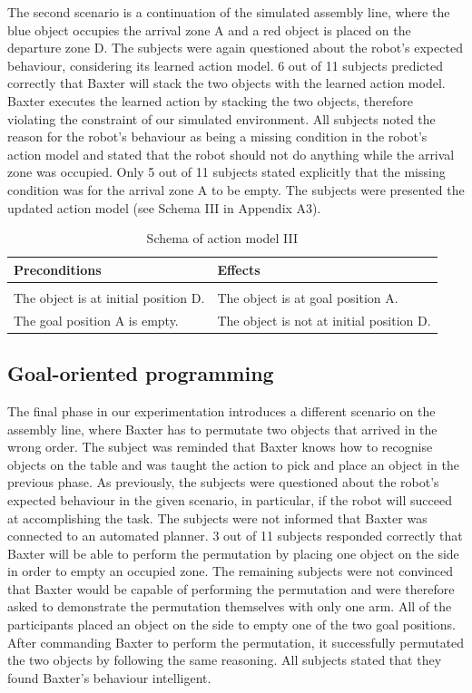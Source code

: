 The second scenario is a continuation of the simulated assembly line, where the blue object occupies the arrival zone A and a red object is placed on the departure zone D. The subjects were again questioned about the robot's expected behaviour, considering its learned action model. 6 out of 11 subjects predicted correctly that Baxter will stack the two objects with the learned action model. Baxter executes the learned action by stacking the two objects, therefore violating the constraint of our simulated environment. All subjects noted the reason for the robot's behaviour as being a missing condition in the robot's action model and stated that the robot should not do anything while the arrival zone was occupied. Only 5 out of 11 subjects stated explicitly that the missing condition was for the arrival zone A to be empty. The subjects were presented the updated action model (see Schema III in Appendix A3).
\begin{table}[h]
	\begin{center}
		\begin{tabular}{l|l}
			Preconditions & Effects\\ \hline
			& \\
			The object is at initial position D. & The object is at goal position A.\\
			The goal position A is empty. & The object is not at initial position D.
		\end{tabular}
	\end{center}
	\label{tab:schema3}
	\caption{Schema of action model III}
\end{table}

\subsection{Goal-oriented programming}
The final phase in our experimentation introduces a different scenario on the assembly line, where Baxter has to permutate two objects that arrived in the wrong order. The subject was reminded that Baxter knows how to recognise objects on the table and was taught the action to pick and place an object in the previous phase. As previously, the subjects were questioned about the robot's expected behaviour in the given scenario, in particular, if the robot will succeed at accomplishing the task. The subjects were not informed that Baxter was connected to an automated planner. 3 out of 11 subjects responded correctly that Baxter will be able to perform the permutation by placing one object on the side in order to empty an occupied zone. The remaining subjects were not convinced that Baxter would be capable of performing the permutation and were therefore asked to demonstrate the permutation themselves with only one arm. All of the participants placed an object on the side to empty one of the two goal positions. After commanding Baxter to perform the permutation, it successfully permutated the two objects by following the same reasoning. All subjects stated that they found Baxter's behaviour intelligent.

